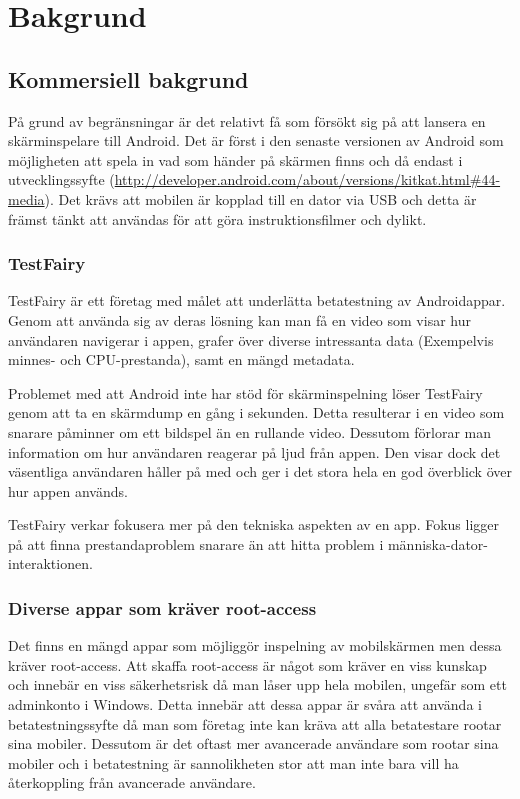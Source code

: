 \section{Bakgrund}
\subsection{Kommersiell bakgrund}
På grund av begränsningar är det relativt få som försökt sig på att lansera en skärminspelare till Android. Det är först i den senaste versionen av Android som möjligheten att spela in vad som händer på skärmen finns och då endast i utvecklingssyfte (\url{http://developer.android.com/about/versions/kitkat.html#44-media}). Det krävs att mobilen är kopplad till en dator via USB och detta är främst tänkt att användas för att göra instruktionsfilmer och dylikt.
\subsubsection{TestFairy}
TestFairy är ett företag med målet att underlätta betatestning av Androidappar. Genom att använda sig av deras lösning kan man få en video som visar hur användaren navigerar i appen, grafer över diverse intressanta data (Exempelvis minnes- och CPU-prestanda), samt en mängd metadata.

Problemet med att Android inte har stöd för skärminspelning löser TestFairy genom att ta en skärmdump en gång i sekunden. Detta resulterar i en video som snarare påminner om ett bildspel än en rullande video. Dessutom förlorar man information om hur användaren reagerar på ljud från appen. Den visar dock det väsentliga användaren håller på med och ger i det stora hela en god överblick över hur appen används.

TestFairy verkar fokusera mer på den tekniska aspekten av en app. Fokus ligger på att finna  prestandaproblem snarare än att hitta problem i människa-dator-interaktionen. 

\subsubsection{Diverse appar som kräver root-access}
Det finns en mängd appar som möjliggör inspelning av mobilskärmen men dessa kräver root-access. Att skaffa root-access är något som kräver en viss kunskap och innebär en viss säkerhetsrisk då man låser upp hela mobilen, ungefär som ett adminkonto i Windows. Detta innebär att dessa appar är svåra att använda i betatestningssyfte då man som företag inte kan kräva att alla betatestare rootar sina mobiler. Dessutom är det oftast mer avancerade användare som rootar sina mobiler och i betatestning är sannolikheten stor att man inte bara vill ha återkoppling från avancerade användare. 

